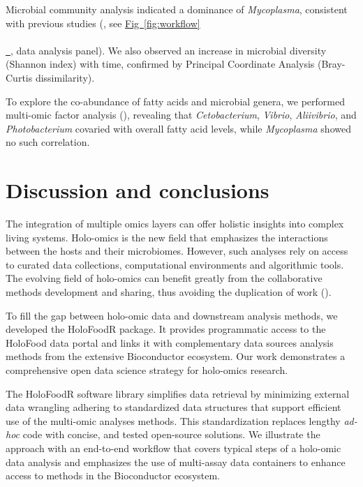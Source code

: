 \documentclass[unnumsec,webpdf,namedate,modern,large]{oup-authoring-template}%
\newcommand*{\figref}[2][]{%
  \hyperref[{fig:#2}]{%
    Fig~\ref*{fig:#2}%
    \ifx\\#1\\%
    \else
      \,#1%
    \fi
  }%
}
\begin{document}
Microbial community analysis indicated a dominance of {\it Mycoplasma}, consistent with previous studies ({\cite{zarkasiPyrosequencingbasedCharacterizationGastrointestinal2014,bozzi_salmon_2021}}, see \figref{workflow}, data analysis panel). We also observed an increase in microbial diversity (Shannon index) with time, confirmed by Principal Coordinate Analysis (Bray-Curtis dissimilarity).

To explore the co-abundance of fatty acids and microbial genera, we performed multi-omic factor analysis (\cite{argelaguet_mofa_2020}), revealing that {\it Cetobacterium}, {\it Vibrio}, {\it Aliivibrio}, and {\it Photobacterium} covaried with overall fatty acid levels, while {\it Mycoplasma} showed no such correlation.

\section{Discussion and conclusions}

The integration of multiple omics layers can offer holistic insights into complex living systems. Holo-omics is the new field that emphasizes the interactions between the hosts and their microbiomes. However, such analyses rely on access to curated data collections, computational environments and algorithmic tools. The evolving field of holo-omics can benefit greatly from the collaborative methods development and sharing, thus avoiding the duplication of work (\cite{open_microbiome, lahti_open_2018}).

To fill the gap between holo-omic data and downstream analysis methods, we developed the HoloFoodR package. It provides programmatic access to the HoloFood data portal and links it with complementary data sources analysis methods from the extensive Bioconductor ecosystem. Our work demonstrates a comprehensive open data science strategy for holo-omics research.

The HoloFoodR software library simplifies data retrieval by minimizing external data wrangling adhering to standardized data structures that support efficient use of the multi-omic analyses methods. This standardization replaces lengthy \textit{ad-hoc} code with concise, and tested open-source solutions. We illustrate the approach with an end-to-end workflow that covers typical steps of a holo-omic data analysis and emphasizes the use of multi-assay data containers to enhance access to methods in the Bioconductor ecosystem.
\end{document}
